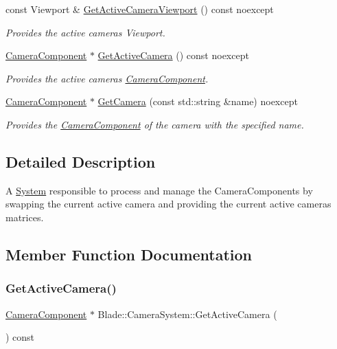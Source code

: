 \begin{DoxyCompactItemize}
const Viewport \& \hyperlink{class_blade_1_1_camera_system_aff681b50b700fb56721fcd844c961e3f}{Get\+Active\+Camera\+Viewport} () const noexcept
\begin{DoxyCompactList}\small\item\em Provides the active camera\textquotesingle{}s Viewport. \end{DoxyCompactList}\item 
\hyperlink{class_blade_1_1_camera_component}{Camera\+Component} $\ast$ \hyperlink{class_blade_1_1_camera_system_aad7510843cd3b0ab6beeff854c96f6ad}{Get\+Active\+Camera} () const noexcept
\begin{DoxyCompactList}\small\item\em Provides the active camera\textquotesingle{}s \hyperlink{class_blade_1_1_camera_component}{Camera\+Component}. \end{DoxyCompactList}\item 
\hyperlink{class_blade_1_1_camera_component}{Camera\+Component} $\ast$ \hyperlink{class_blade_1_1_camera_system_aa6fcc138bf6920081fb7a36ddf362894}{Get\+Camera} (const std\+::string \&name) noexcept
\begin{DoxyCompactList}\small\item\em Provides the \hyperlink{class_blade_1_1_camera_component}{Camera\+Component} of the camera with the specified name. \end{DoxyCompactList}\end{DoxyCompactItemize}


\subsection{Detailed Description}
A \hyperlink{class_blade_1_1_system}{System} responsible to process and manage the Camera\+Components by swapping the current active camera and providing the current active camera\textquotesingle{}s matrices. 

\subsection{Member Function Documentation}
\mbox{\label{class_blade_1_1_camera_system_aad7510843cd3b0ab6beeff854c96f6ad}} 
\subsubsection{\texorpdfstring{Get\+Active\+Camera()}{GetActiveCamera()}}
{\footnotesize\ttfamily \hyperlink{class_blade_1_1_camera_component}{Camera\+Component} $\ast$ Blade\+::\+Camera\+System\+::\+Get\+Active\+Camera (\begin{DoxyParamCaption}{ }\end{DoxyParamCaption}) const\hspace{0.3cm}{\ttfamily [noexcept]}}



